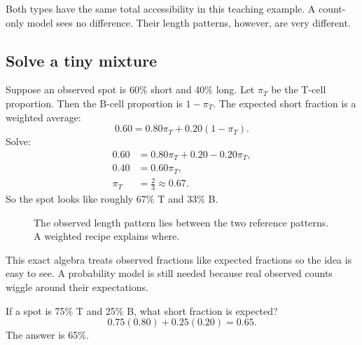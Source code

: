 \documentclass[11pt]{article}
\begin{document}
Both types have the same total accessibility in this teaching example. A
count-only model sees no difference. Their length patterns, however, are very
different.

\subsection{Solve a tiny mixture}

Suppose an observed spot is 60\% short and 40\% long. Let \(\pi_T\) be the T-cell
proportion. Then the B-cell proportion is \(1-\pi_T\). The expected short fraction
is a weighted average:
\[
0.60=0.80\pi_T+0.20(1-\pi_T).
\]
Solve:
\[
\begin{aligned}
0.60&=0.80\pi_T+0.20-0.20\pi_T,\\
0.40&=0.60\pi_T,\\
\pi_T&=\frac{2}{3}\approx0.67.
\end{aligned}
\]
So the spot looks like roughly 67\% T and 33\% B.

\begin{figure}[H]
\centering
{}
\caption{The observed length pattern lies between the two reference patterns. A weighted recipe explains where.}
\end{figure}

\begin{watchout}
This exact algebra treats observed fractions like expected fractions so the idea is
easy to see. A probability model is still needed because real observed counts
wiggle around their expectations.
\end{watchout}

\begin{checkpoint}
If a spot is 75\% T and 25\% B, what short fraction is expected?
\[
0.75(0.80)+0.25(0.20)=0.65.
\]
The answer is 65\%.
\end{checkpoint}
\end{document}

